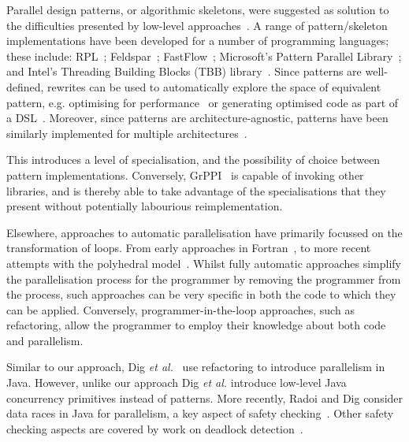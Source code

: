 Parallel design patterns, or algorithmic skeletons, were suggested as solution to the difficulties presented by low-level approaches~\cite{Asanovic:2009:VPC,DBLP:journals/spe/Gonzalez-VelezL10}.
A range of pattern/skeleton implementations have been developed for a number of programming languages; these include: RPL~\cite{DBLP:conf/pdp/JanjicBMHDAG16}; Feldspar~\cite{DBLP:conf/ifl/AxelssonCSSEP10}; FastFlow~\cite{DBLP:journals/mis/JinLWY15}; Microsoft's Pattern Parallel Library~\cite{ACM:book/msoft/CampbellM11}; and Intel's Threading Building Blocks (TBB) library~\cite{DBLP:reference/parallel/X11pz}.
Since patterns are well-defined, rewrites can be used to automatically explore the space of equivalent pattern, e.g. optimising for performance~\cite{DBLP:conf/europar/MatsuzakiKIHA04,DBLP:conf/ipps/GorlatchWL99} or generating optimised code as part of a DSL~\cite{DBLP:conf/dagstuhl/Gorlatch03}. Moreover, since patterns are architecture-agnostic, patterns have been similarly implemented for multiple architectures~\cite{DBLP:conf/cgo/HagedornSSGD18,DBLP:conf/parco/ReyesL15}.

This introduces a level of specialisation, and the possibility of choice between pattern implementations. Conversely, GrPPI~\cite{DBLP:journals/concurrency/AstorgaD0G17} is capable of invoking other libraries, and is thereby able to take advantage of the specialisations that they present without potentially labourious reimplementation.


Elsewhere, approaches to automatic parallelisation have primarily focussed on the transformation of loops. From early approaches in Fortran~\cite{DBLP:journals/cacm/Lamport74}, to more recent attempts with the polyhedral model~\cite{DBLP:conf/ppopp/AncourtI91}. Whilst fully automatic approaches simplify the parallelisation process for the programmer by removing the programmer from the process, such approaches can be very specific in both the code to which they can be applied. Conversely, programmer-in-the-loop approaches, such as refactoring, allow the programmer to employ their knowledge about both code and parallelism.

Similar to our approach, Dig \textit{et al.}~\cite{dig} use refactoring to introduce parallelism in Java. However, unlike our approach Dig \textit{et al.} introduce low-level Java concurrency primitives instead of patterns. More recently,  Radoi and Dig consider data races in Java for parallelism, a key aspect of safety checking~\cite{DBLP:journals/tosem/RadoiD15}. Other safety checking aspects are covered by work on deadlock detection~\cite{DBLP:journals/tse/Corbett96}.






